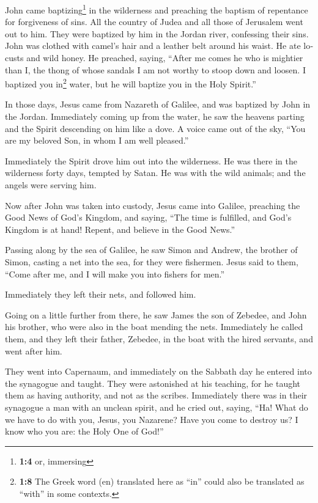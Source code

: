 \begin{paracol}{2}
\begin{otherlanguage}{english}
 John came baptizing\footnote{\textbf{1:4} or, immersing}
in the wilderness and preaching the baptism of repentance for
forgiveness of sins.  All the country of Judea and all
those of Jerusalem went out to him. They were baptized by him in the
Jordan river, confessing their sins.  John was clothed
with camel's hair and a leather belt around his waist. He ate locusts
and wild honey.  He preached, saying, ``After me comes he
who is mightier than I, the thong of whose sandals I am not worthy to
stoop down and loosen.  I baptized you in\footnote{\textbf{1:8}
  The Greek word (en) translated here as ``in'' could also be translated
  as ``with'' in some contexts.} water, but he will baptize you in the
Holy Spirit.''

 In those days, Jesus came from Nazareth of Galilee, and
was baptized by John in the Jordan.  Immediately coming
up from the water, he saw the heavens parting and the Spirit descending
on him like a dove.  A voice came out of the sky, ``You
are my beloved Son, in whom I am well pleased.''

 Immediately the Spirit drove him out into the
wilderness.  He was there in the wilderness forty days,
tempted by Satan. He was with the wild animals; and the angels were
serving him.

 Now after John was taken into custody, Jesus came into
Galilee, preaching the Good News of God's Kingdom,  and
saying, ``The time is fulfilled, and God's Kingdom is at hand! Repent,
and believe in the Good News.''

 Passing along by the sea of Galilee, he saw Simon and
Andrew, the brother of Simon, casting a net into the sea, for they were
fishermen.  Jesus said to them, ``Come after me, and I
will make you into fishers for men.''

 Immediately they left their nets, and followed him.

 Going on a little further from there, he saw James the
son of Zebedee, and John his brother, who were also in the boat mending
the nets.  Immediately he called them, and they left
their father, Zebedee, in the boat with the hired servants, and went
after him.

 They went into Capernaum, and immediately on the Sabbath
day he entered into the synagogue and taught.  They were
astonished at his teaching, for he taught them as having authority, and
not as the scribes.  Immediately there was in their
synagogue a man with an unclean spirit, and he cried out,
 saying, ``Ha! What do we have to do with you, Jesus, you
Nazarene? Have you come to destroy us? I know who you are: the Holy One
of God!''


\end{otherlanguage}
\end{paracol}
